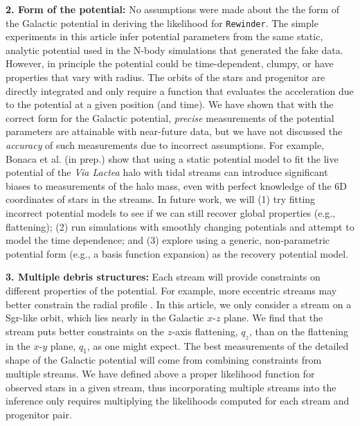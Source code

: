 \documentclass{emulateapj}
\newcommand{\project}[1]{\textsl{#1}}
\newcommand{\rewinder}{\texttt{Rewinder}}
\begin{document}
{\bf 2. Form of the potential:} No assumptions were made about the the form of the Galactic potential in deriving the likelihood for \rewinder. The simple experiments in this article infer potential parameters from the same static, analytic potential used in the N-body simulations that generated the fake data. However, in principle the potential could be time-dependent, clumpy, or have properties that vary with radius. The orbits of the stars and progenitor are directly integrated and only require a function that evaluates the acceleration due to the potential at a given position (and time). We have shown that with the correct form for the Galactic potential, \emph{precise} measurements of the potential parameters are attainable with near-future data, but we have not discussed the \emph{accuracy} of such measurements due to incorrect assumptions. For example, Bonaca et al. (in prep.) show that using a static potential model to fit the live potential of the \project{Via Lactea} halo with tidal streams can introduce significant biases to measurements of the halo mass, even with perfect knowledge of the 6D coordinates of stars in the streams. In future work, we will (1) try fitting incorrect potential models to see if we can still recover global properties (e.g., flattening); (2) run simulations with smoothly changing potentials \citep[e.g.,][]{buist14} and attempt to model the time dependence; and (3) explore using a generic, non-parametric potential form (e.g., a basis function expansion) as the recovery potential model. 

{\bf 3. Multiple debris structures:} Each stream will provide constraints on different properties of the potential. For example, more eccentric streams may better constrain the radial profile \citep[see][who illustrate the power of using multiple streams to simultaneously constrain the potential using orbit fitting]{deg14}. In this article, we only consider a stream on a Sgr-like orbit, which lies nearly in the Galactic $x$-$z$ plane. We find that the stream puts better constraints on the $z$-axis flattening, $q_z$, than on the flattening in the $x$-$y$ plane, $q_1$, as one might expect. The best measurements of the detailed shape of the Galactic potential will come from combining constraints from multiple streams. We have defined above a proper likelihood function for observed stars in a given stream, thus incorporating multiple streams into the inference only requires multiplying the likelihoods computed for each stream and progenitor pair.
\end{document}
